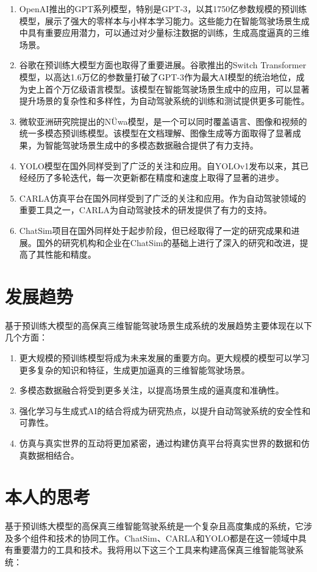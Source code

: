 \documentclass{article}
\begin{document}
\begin{enumerate}[label=\arabic*.]
    \item OpenAI推出的GPT系列模型，特别是GPT-3，以其1750亿参数规模的预训练模型，展示了强大的零样本与小样本学习能力。这些能力在智能驾驶场景生成中具有重要应用潜力，可以通过对少量标注数据的训练，生成高度逼真的三维场景。
    \item 谷歌在预训练大模型方面也取得了重要进展。谷歌推出的Switch Transformer模型，以高达1.6万亿的参数量打破了GPT-3作为最大AI模型的统治地位，成为史上首个万亿级语言模型。该模型在智能驾驶场景生成中的应用，可以显著提升场景的复杂性和多样性，为自动驾驶系统的训练和测试提供更多可能性。
    \item 微软亚洲研究院提出的NÜwa模型，是一个可以同时覆盖语言、图像和视频的统一多模态预训练模型。该模型在文档理解、图像生成等方面取得了显著成果，为智能驾驶场景生成中的多模态数据融合提供了有力支持。
    \item YOLO模型在国外同样受到了广泛的关注和应用。自YOLOv1发布以来，其已经经历了多轮迭代，每一次更新都在精度和速度上取得了显著的进步。
    \item CARLA仿真平台在国外同样受到了广泛的关注和应用。作为自动驾驶领域的重要工具之一，CARLA为自动驾驶技术的研发提供了有力的支持。
    \item ChatSim项目在国外同样处于起步阶段，但已经取得了一定的研究成果和进展。国外的研究机构和企业在ChatSim的基础上进行了深入的研究和改进，提高了其性能和精度。
\end{enumerate}

\section{发展趋势}
基于预训练大模型的高保真三维智能驾驶场景生成系统的发展趋势主要体现在以下几个方面：

\begin{enumerate}[label=\arabic*.]
    \item 更大规模的预训练模型将成为未来发展的重要方向。更大规模的模型可以学习更多复杂的知识和特征，生成更加逼真的三维智能驾驶场景。
    \item 多模态数据融合将受到更多关注，以提高场景生成的逼真度和准确性。
    \item 强化学习与生成式AI的结合将成为研究热点，以提升自动驾驶系统的安全性和可靠性。
    \item 仿真与真实世界的互动将更加紧密，通过构建仿真平台将真实世界的数据和仿真数据相结合。
\end{enumerate}

\section{本人的思考}
基于预训练大模型的高保真三维智能驾驶系统是一个复杂且高度集成的系统，它涉及多个组件和技术的协同工作。ChatSim、CARLA和YOLO都是在这一领域中具有重要潜力的工具和技术。我将用以下这三个工具来构建高保真三维智能驾驶系统：
\end{document}
